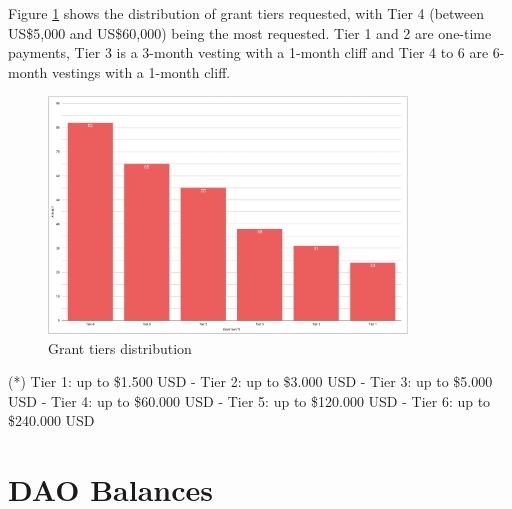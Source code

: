 \documentclass[MSE,Master,english]{twbook}%
\begin{document}
Figure \ref{fig:tier_distribution} shows the distribution of grant tiers requested, with Tier 4 (between US\$5,000 and US\$60,000) being the most requested. Tier 1 and 2 are one-time payments, Tier 3 is a 3-month vesting with a 1-month cliff and Tier 4 to 6 are 6-month vestings with a 1-month cliff.
\begin{figure}[H]
  \centering
  \includegraphics[width=0.85\textwidth]{metrics/tier_distribution.png}
  \caption{Grant tiers distribution}
  \label{fig:tier_distribution}
\end{figure}
(*) Tier 1: up to \$1.500 USD - Tier 2: up to \$3.000 USD - Tier 3: up to \$5.000 USD - Tier 4: up to \$60.000 USD - Tier 5: up to \$120.000 USD - Tier 6: up to \$240.000 USD

\section{DAO Balances}
\end{document}
